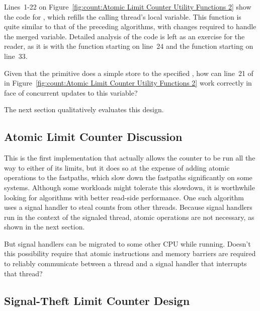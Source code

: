 Lines~1-22 on
Figure~\ref{fig:count:Atomic Limit Counter Utility Functions 2}
show the code for , which refills
the calling thread's local  variable.
This function is quite similar to that of the preceding algorithms,
with changes required to handle the merged  variable.
Detailed analysis of the code is left as an exercise for the reader,
as it is with the  function starting on
line~24 and the  function starting on
line~33.

\QuickQuiz{}
	Given that the  primitive does a simple
	store to the specified , how can line~21 of
	 in
	Figure~\ref{fig:count:Atomic Limit Counter Utility Functions 2}
	work correctly in face of concurrent 
	updates to this variable?
 \QuickQuizEnd

The next section qualitatively evaluates this design.

\subsection{Atomic Limit Counter Discussion}

This is the first implementation that actually allows the counter to
be run all the way to either of its limits, but it does so at the
expense of adding atomic operations to the fastpaths, which slow down
the fastpaths significantly on some systems.
Although some workloads might tolerate this slowdown, it is worthwhile
looking for algorithms with better read-side performance.
One such algorithm uses a signal handler to steal counts from other
threads.
Because signal handlers run in the context of the signaled thread,
atomic operations are not necessary, as shown in the next section.

\QuickQuiz{}
	But signal handlers can be migrated to some other
	CPU while running.
	Doesn't this possibility require that atomic instructions
	and memory barriers are required to reliably communicate
	between a thread and a signal handler that interrupts that
	thread?
 \QuickQuizEnd

\subsection{Signal-Theft Limit Counter Design}
\label{sec:count:Signal-Theft Limit Counter Design}

